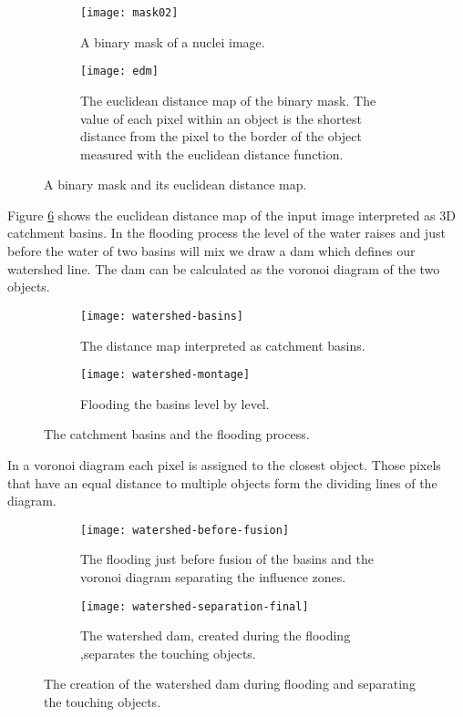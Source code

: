 \begin{figure}[h!]
  \centering
\begin{subfigure}[t]{0.30\textwidth}
\texttt{[image: mask02]}
    \caption[A binary mask]{A binary mask of a nuclei image.}
    \label{input-mask}
\end{subfigure}  
\begin{subfigure}[t]{0.30\textwidth}
\texttt{[image: edm]}
    \caption[edm]{The euclidean distance map of the binary mask. The value of each pixel within an object is the shortest distance from the pixel to the border of the object measured with the euclidean distance function.}
    \label{edm}
\end{subfigure}
   \caption{A binary mask and its euclidean distance map.}
   \label{mask-and-edm}
\end{figure}

Figure \ref{basins-and-flooding} shows the euclidean distance map of the input image interpreted as 3D catchment basins. In the flooding process the level of the water raises and just before the water of two basins will mix we draw a dam which defines our watershed line. The dam can be calculated as the voronoi diagram of the two objects. 
 
\begin{figure}[h!]
  \centering
\begin{subfigure}[t]{0.30\textwidth}
\texttt{[image: watershed-basins]}
    \caption[Basins]{The distance map interpreted as catchment basins.}
    \label{input-mask}
\end{subfigure}  
\begin{subfigure}[t]{0.30\textwidth}
\texttt{[image: watershed-montage]}
    \caption[Flooding]{Flooding the basins level by level.}
    \label{edm}
\end{subfigure}
   \caption{The catchment basins and the flooding process.}
   \label{basins-and-flooding}
\end{figure}

In a voronoi diagram each pixel is assigned to the closest object. Those pixels that have an equal distance to multiple objects form the dividing lines of the diagram.

\begin{figure}[h!]
  \centering
\begin{subfigure}[t]{0.30\textwidth}
\texttt{[image: watershed-before-fusion]}
    \caption[Voronoi]{The flooding just before fusion of the basins and the voronoi diagram separating the influence zones.}
    \label{watershed-before-fusion}
\end{subfigure}  
\begin{subfigure}[t]{0.30\textwidth}
\texttt{[image: watershed-separation-final]}
    \caption[Watershed dam]{The watershed dam, created during the flooding ,separates the touching objects.}
    \label{Watershed dam}
\end{subfigure}
   \caption{The creation of the watershed dam during flooding and separating the touching objects.}
   \label{watershed-dam-final}
\end{figure}

